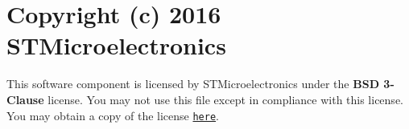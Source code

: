 \chapter{Copyright (c) 2016 STMicroelectronics }
\hypertarget{md__drivers_2_s_t_m32_l0xx___h_a_l___driver_2_license}{}\label{md__drivers_2_s_t_m32_l0xx___h_a_l___driver_2_license}
\label{md__drivers_2_s_t_m32_l0xx___h_a_l___driver_2_license_autotoc_md0}%
%


This software component is licensed by STMicroelectronics under the {\bfseries{BSD 3-\/Clause}} license. You may not use this file except in compliance with this license. You may obtain a copy of the license \href{https://opensource.org/licenses/BSD-3-Clause}{\texttt{here}}. 